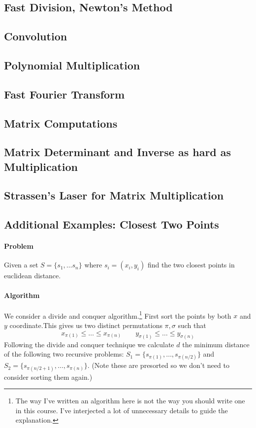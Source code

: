 \documentclass[10pt]{article}
\theoremstyle{plain}
\theoremstyle{definition}
\numberwithin{equation}{section}
\numberwithin{figure}{section}
\begin{document}
\subsection{Fast Division, Newton's Method}

\subsection{Convolution}

\subsection{Polynomial Multiplication}

\subsection{Fast Fourier Transform}

\subsection{Matrix Computations}

\subsection{Matrix Determinant and Inverse as hard as Multiplication}

\subsection{Strassen's Laser for Matrix Multiplication}

\subsection{Additional Examples: Closest Two Points}

\paragraph{Problem} Given a set $S = \{s_1, \ldots s_n\}$ where $s_i = (x_i, y_i)$ find the two closest points in euclidean distance.

\paragraph{Algorithm}We consider a divide and conquer algorithm.\footnote{The way I've written an algorithm here is not the way you should write one in this course. I've interjected a lot of unnecessary details to guide the explanation.}  First sort the points by both $x$ and $y$ coordinate.This gives us two distinct permutations $\pi, \sigma$ such that
\begin{equation}
x_{\pi(1)} \leq \ldots \leq x_{\pi(n)} \qquad y_{\sigma(1)} \leq \ldots \leq y_{\sigma(n)}
\end{equation}
Following the divide and conquer technique we calculate $d$ the minimum distance of the following two recursive problems: $S_1 = \{s_{\pi(1)}, \ldots, s_{\pi(n/2)}\}$ and $S_2 = \{s_{\pi(n/2 + 1)}, \ldots, s_{\pi(n)}\}$. (Note these are presorted so we don't need to consider sorting them again.) \\
\end{document}

